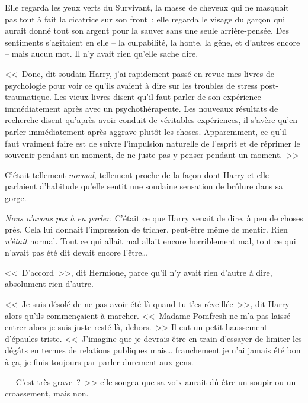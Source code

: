 Elle regarda les yeux verts du Survivant, la masse de cheveux qui ne masquait pas tout à fait la cicatrice sur son front~; elle regarda le visage du garçon qui aurait donné tout son argent pour la sauver sans une seule arrière-pensée. Des sentiments s'agitaient en elle -- la culpabilité, la honte, la gêne, et d'autres encore -- mais aucun mot. Il n'y avait rien qu'elle sache dire.

<<~Donc, dit soudain Harry, j'ai rapidement passé en revue mes livres de psychologie pour voir ce qu'ils avaient à dire sur les troubles de stress post-traumatique. Les vieux livres disent qu'il faut parler de son expérience immédiatement après avec un psychothérapeute. Les nouveaux résultats de recherche disent qu'après avoir conduit de véritables expériences, il s'avère qu'en parler immédiatement après aggrave plutôt les choses. Apparemment, ce qu'il faut vraiment faire est de suivre l'impulsion naturelle de l'esprit et de réprimer le souvenir pendant un moment, de ne juste pas y penser pendant un moment.~>>

C'était tellement \emph{normal}, tellement proche de la façon dont Harry et elle parlaient d'habitude qu'elle sentit une soudaine sensation de brûlure dans sa gorge.

\emph{Nous n'avons pas à en parler}. C'était ce que Harry venait de dire, à peu de choses près. Cela lui donnait l'impression de tricher, peut-être même de mentir. Rien \emph{n'était} normal. Tout ce qui allait mal allait encore horriblement mal, tout ce qui n'avait pas été dit devait encore l'être…

<<~D'accord~>>, dit Hermione, parce qu'il n'y avait rien d'autre à dire, absolument rien d'autre.

<<~Je suis désolé de ne pas avoir été là quand tu t'es réveillée~>>, dit Harry alors qu'ils commençaient à marcher. <<~Madame Pomfresh ne m'a pas laissé entrer alors je suis juste resté là, dehors.~>> Il eut un petit haussement d'épaules triste. <<~J'imagine que je devrais être en train d'essayer de limiter les dégâts en termes de relations publiques mais… franchement je n'ai jamais été bon à ça, je finis toujours par parler durement aux gens.

--- C'est très grave~?~>> elle songea que sa voix aurait dû être un soupir ou un croassement, mais non.


